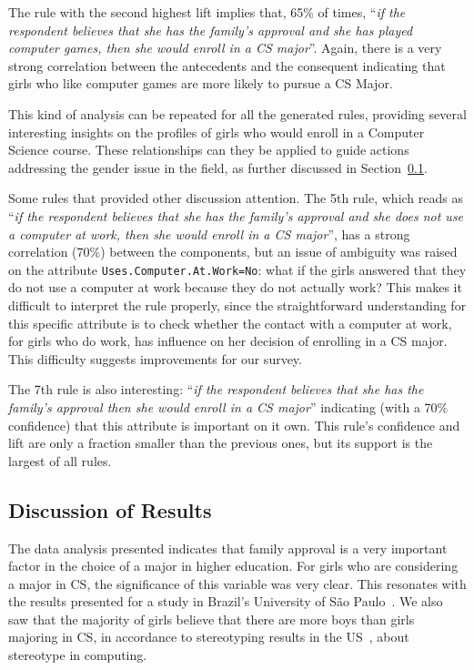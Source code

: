 The rule with the second highest lift implies that, 65\% of times, ``\emph{if the respondent believes that she has the family's approval and she has played computer games, then she would enroll in a CS major}''. Again, there is a very strong correlation between the antecedents and the consequent indicating that girls who like computer games are more likely to pursue a CS Major.

This kind of analysis can be repeated for all the generated rules, providing several interesting insights on the profiles of girls who would enroll in a Computer Science course. These relationships can they be applied to guide actions addressing the gender issue in the field, as further discussed in Section~\ref{sec:perception:discussion}.

Some rules that provided other discussion attention. The 5th rule, which reads as ``\emph{if the respondent believes that she has the family's approval and she does not use a computer at work, then she would enroll in a CS major}'', has a strong correlation (70\%) between the components, but an issue of ambiguity was raised on the attribute \texttt{Uses.Computer.At.Work=No}: what if the girls answered that they do not use a computer at work because they do not actually work? This makes it difficult to interpret the rule properly, since the straightforward understanding for this specific attribute is to check whether the contact with a computer at work, for girls who do work, has influence on her decision of enrolling in a CS major. This difficulty suggests improvements for our survey.

The 7th rule is also interesting: ``\emph{if the respondent believes that she has the family's approval then she would enroll in a CS major}'' indicating (with a 70\% confidence) that this attribute is important on it own. This rule's confidence and lift are only a fraction smaller than the previous ones, but its support is the largest of all rules.

\subsection{Discussion of Results}\label{sec:perception:discussion}%
The data analysis presented indicates that family approval is a very important factor in the choice of a major in higher education. For girls who are considering a major in CS, the significance of this variable was very clear. This resonates with the results presented for a study in Brazil's University of São Paulo~\cite{saboya_2009}. We also saw that the majority of girls believe that there are more boys than girls majoring in CS, in accordance to stereotyping results in the US~\cite{Mercier_2006}, about stereotype in computing.

